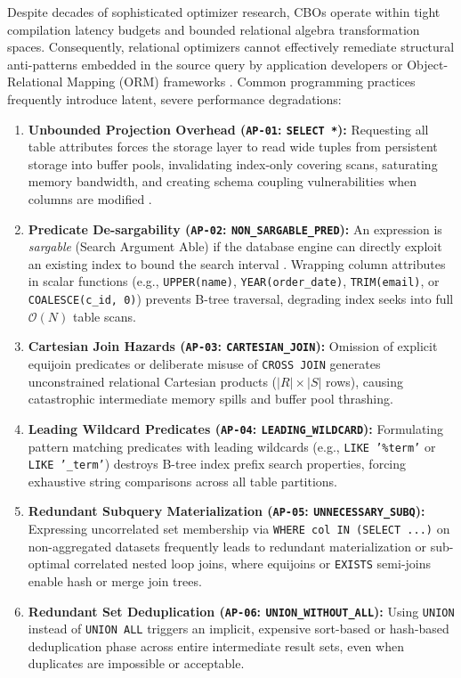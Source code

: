 \documentclass[conference]{IEEEtran}
\begin{document}
Despite decades of sophisticated optimizer research, CBOs operate within tight compilation latency budgets and bounded relational algebra transformation spaces. Consequently, relational optimizers cannot effectively remediate structural anti-patterns embedded in the source query by application developers or Object-Relational Mapping (ORM) frameworks \cite{karwin2010sql}. Common programming practices frequently introduce latent, severe performance degradations:
\begin{enumerate}
    \item \textbf{Unbounded Projection Overhead (\texttt{AP-01}: \texttt{SELECT *}):} Requesting all table attributes forces the storage layer to read wide tuples from persistent storage into buffer pools, invalidating index-only covering scans, saturating memory bandwidth, and creating schema coupling vulnerabilities when columns are modified \cite{stonebraker2005cstore}.
    \item \textbf{Predicate De-sargability (\texttt{AP-02}: \texttt{NON\_SARGABLE\_PRED}):} An expression is \textit{sargable} (Search Argument Able) if the database engine can directly exploit an existing index to bound the search interval \cite{selinger1979access}. Wrapping column attributes in scalar functions (e.g., \texttt{UPPER(name)}, \texttt{YEAR(order\_date)}, \texttt{TRIM(email)}, or \texttt{COALESCE(c\_id, 0)}) prevents B-tree traversal, degrading index seeks into full $\mathcal{O}(N)$ table scans.
    \item \textbf{Cartesian Join Hazards (\texttt{AP-03}: \texttt{CARTESIAN\_JOIN}):} Omission of explicit equijoin predicates or deliberate misuse of \texttt{CROSS JOIN} generates unconstrained relational Cartesian products ($|R| \times |S|$ rows), causing catastrophic intermediate memory spills and buffer pool thrashing.
    \item \textbf{Leading Wildcard Predicates (\texttt{AP-04}: \texttt{LEADING\_WILDCARD}):} Formulating pattern matching predicates with leading wildcards (e.g., \texttt{LIKE '\%term'} or \texttt{LIKE '\_term'}) destroys B-tree index prefix search properties, forcing exhaustive string comparisons across all table partitions.
    \item \textbf{Redundant Subquery Materialization (\texttt{AP-05}: \texttt{UNNECESSARY\_SUBQ}):} Expressing uncorrelated set membership via \texttt{WHERE col IN (SELECT ...)} on non-aggregated datasets frequently leads to redundant materialization or sub-optimal correlated nested loop joins, where equijoins or \texttt{EXISTS} semi-joins enable hash or merge join trees.
    \item \textbf{Redundant Set Deduplication (\texttt{AP-06}: \texttt{UNION\_WITHOUT\_ALL}):} Using \texttt{UNION} instead of \texttt{UNION ALL} triggers an implicit, expensive sort-based or hash-based deduplication phase across entire intermediate result sets, even when duplicates are impossible or acceptable.
\end{enumerate}
\end{document}
